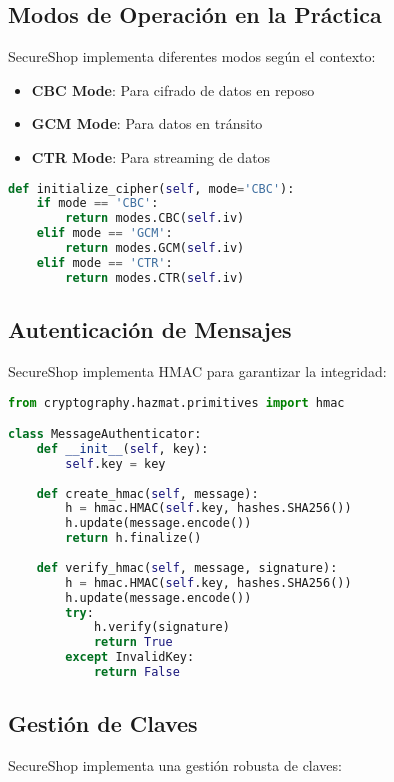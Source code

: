 \subsection{Modos de Operación en la Práctica}
SecureShop implementa diferentes modos según el contexto:

\begin{itemize}
    \item \textbf{CBC Mode}: Para cifrado de datos en reposo
    \item \textbf{GCM Mode}: Para datos en tránsito
    \item \textbf{CTR Mode}: Para streaming de datos
\end{itemize}

\begin{lstlisting}[language=Python, caption=Implementación de diferentes modos]
def initialize_cipher(self, mode='CBC'):
    if mode == 'CBC':
        return modes.CBC(self.iv)
    elif mode == 'GCM':
        return modes.GCM(self.iv)
    elif mode == 'CTR':
        return modes.CTR(self.iv)
\end{lstlisting}

\subsection{Autenticación de Mensajes}
SecureShop implementa HMAC para garantizar la integridad:

\begin{lstlisting}[language=Python, caption=Implementación HMAC]
from cryptography.hazmat.primitives import hmac

class MessageAuthenticator:
    def __init__(self, key):
        self.key = key
    
    def create_hmac(self, message):
        h = hmac.HMAC(self.key, hashes.SHA256())
        h.update(message.encode())
        return h.finalize()
    
    def verify_hmac(self, message, signature):
        h = hmac.HMAC(self.key, hashes.SHA256())
        h.update(message.encode())
        try:
            h.verify(signature)
            return True
        except InvalidKey:
            return False
\end{lstlisting}

\subsection{Gestión de Claves}
SecureShop implementa una gestión robusta de claves:

